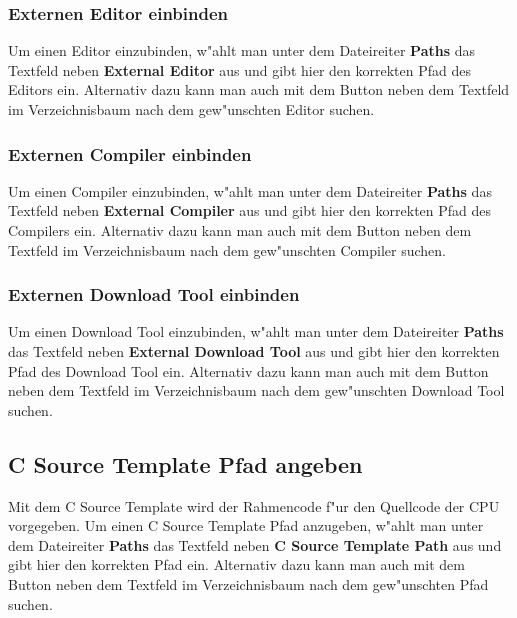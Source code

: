 \documentclass[a4paper,titlepage,12pt,ngerman]{scrbook}
\begin{document}
\subsubsection{Externen Editor einbinden}
Um einen Editor einzubinden, w"ahlt man unter dem Dateireiter {\bf Paths} das Textfeld neben {\bf External Editor} aus und gibt hier den korrekten Pfad des Editors ein. Alternativ dazu kann man auch mit dem Button neben dem Textfeld im Verzeichnisbaum nach dem gew"unschten Editor suchen.\par
\subsubsection{Externen Compiler einbinden}
Um einen Compiler einzubinden, w"ahlt man unter dem Dateireiter {\bf Paths} das Textfeld neben {\bf External Compiler} aus und gibt hier den korrekten Pfad des Compilers ein. Alternativ dazu kann man auch mit dem Button neben dem Textfeld im Verzeichnisbaum nach dem gew"unschten Compiler suchen.\par
\subsubsection{Externen Download Tool einbinden}
Um einen Download Tool einzubinden, w"ahlt man unter dem Dateireiter {\bf Paths} das Textfeld neben {\bf External Download Tool} aus und gibt hier den korrekten Pfad des Download Tool ein. Alternativ dazu kann man auch mit dem Button neben dem Textfeld im Verzeichnisbaum nach dem gew"unschten Download Tool suchen. \par
\newpage

\subsection{C Source Template Pfad angeben}
Mit dem C Source Template wird der Rahmencode f"ur den Quellcode der CPU vorgegeben.
Um einen C Source Template Pfad anzugeben, w"ahlt man unter dem Dateireiter {\bf Paths} das Textfeld neben {\bf C Source Template Path} aus und gibt hier den korrekten Pfad ein. Alternativ dazu kann man auch mit dem Button neben dem Textfeld im Verzeichnisbaum nach dem gew"unschten Pfad suchen. \par


\end{document}
